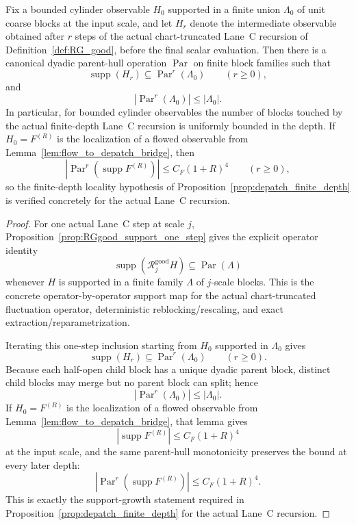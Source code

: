 \begin{theorem}\label{thm:laneC_support_propagation}
Fix a bounded cylinder observable $H_0$ supported in a finite union $\Lambda_0$ of unit coarse blocks at the input scale, and let $H_r$ denote the intermediate observable obtained after $r$ steps of the actual chart-truncated Lane~C recursion of Definition~\ref{def:RG_good}, before the final scalar evaluation.
Then there is a canonical dyadic parent-hull operation $\operatorname{Par}$ on finite block families such that
\[
\operatorname{supp}(H_r)\subseteq \operatorname{Par}^r(\Lambda_0)
\qquad (r\ge0),
\]
and
\[
|\operatorname{Par}^r(\Lambda_0)|\le |\Lambda_0|.
\]
In particular, for bounded cylinder observables the number of blocks touched by the actual finite-depth Lane~C recursion is uniformly bounded in the depth.
If $H_0=F^{(R)}$ is the localization of a flowed observable from Lemma~\ref{lem:flow_to_depatch_bridge}, then
\[
|\operatorname{Par}^r(\operatorname{supp}F^{(R)})|\le C_F(1+R)^4
\qquad (r\ge0),
\]
so the finite-depth locality hypothesis of Proposition~\ref{prop:depatch_finite_depth} is verified concretely for the actual Lane~C recursion.
\end{theorem}

\begin{proof}
For one actual Lane~C step at scale $j$, Proposition~\ref{prop:RGgood_support_one_step} gives the explicit operator identity
\[
\operatorname{supp}(\mathcal R_j^{\mathrm{good}}H)\subseteq \operatorname{Par}(\Lambda)
\]
whenever $H$ is supported in a finite family $\Lambda$ of $j$-scale blocks.
This is the concrete operator-by-operator support map for the actual chart-truncated fluctuation operator, deterministic reblocking/rescaling, and exact extraction/reparametrization.

Iterating this one-step inclusion starting from $H_0$ supported in $\Lambda_0$ gives
\[
\operatorname{supp}(H_r)\subseteq \operatorname{Par}^r(\Lambda_0)
\qquad (r\ge0).
\]
Because each half-open child block has a unique dyadic parent block, distinct child blocks may merge but no parent block can split; hence
\[
|\operatorname{Par}^r(\Lambda_0)|\le |\Lambda_0|.
\]
If $H_0=F^{(R)}$ is the localization of a flowed observable from Lemma~\ref{lem:flow_to_depatch_bridge}, that lemma gives
\[
|\operatorname{supp}F^{(R)}|\le C_F(1+R)^4
\]
at the input scale, and the same parent-hull monotonicity preserves the bound at every later depth:
\[
|\operatorname{Par}^r(\operatorname{supp}F^{(R)})|\le C_F(1+R)^4.
\]
This is exactly the support-growth statement required in Proposition~\ref{prop:depatch_finite_depth} for the actual Lane~C recursion.
\end{proof}

